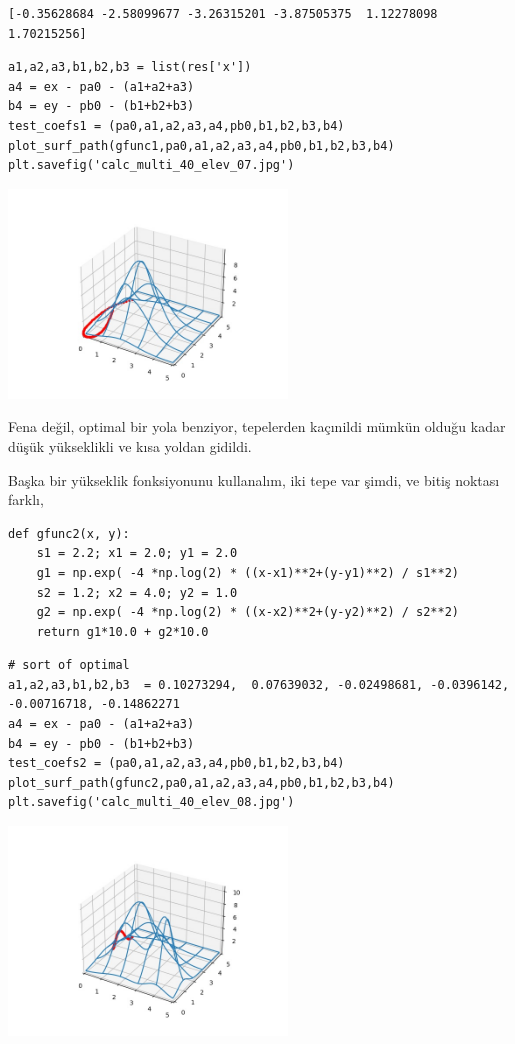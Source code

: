 \documentclass[12pt,fleqn]{article}\usepackage{../../common}
\begin{document}
\begin{verbatim}
[-0.35628684 -2.58099677 -3.26315201 -3.87505375  1.12278098  1.70215256]
\end{verbatim}

\begin{verbatim}
a1,a2,a3,b1,b2,b3 = list(res['x'])
a4 = ex - pa0 - (a1+a2+a3)
b4 = ey - pb0 - (b1+b2+b3)
test_coefs1 = (pa0,a1,a2,a3,a4,pb0,b1,b2,b3,b4)
plot_surf_path(gfunc1,pa0,a1,a2,a3,a4,pb0,b1,b2,b3,b4)
plt.savefig('calc_multi_40_elev_07.jpg')
\end{verbatim}

\includegraphics[width=20em]{calc_multi_40_elev_07.jpg}

Fena değil, optimal bir yola benziyor, tepelerden kaçınildi mümkün olduğu kadar
düşük yükseklikli ve kısa yoldan gidildi.

Başka bir yükseklik fonksiyonunu kullanalım, iki tepe var şimdi, ve
bitiş noktası farklı,

\begin{verbatim}
def gfunc2(x, y):
    s1 = 2.2; x1 = 2.0; y1 = 2.0
    g1 = np.exp( -4 *np.log(2) * ((x-x1)**2+(y-y1)**2) / s1**2)
    s2 = 1.2; x2 = 4.0; y2 = 1.0
    g2 = np.exp( -4 *np.log(2) * ((x-x2)**2+(y-y2)**2) / s2**2)
    return g1*10.0 + g2*10.0
\end{verbatim}

\begin{verbatim}
# sort of optimal
a1,a2,a3,b1,b2,b3  = 0.10273294,  0.07639032, -0.02498681, -0.0396142,  -0.00716718, -0.14862271
a4 = ex - pa0 - (a1+a2+a3)
b4 = ey - pb0 - (b1+b2+b3)
test_coefs2 = (pa0,a1,a2,a3,a4,pb0,b1,b2,b3,b4)
plot_surf_path(gfunc2,pa0,a1,a2,a3,a4,pb0,b1,b2,b3,b4)
plt.savefig('calc_multi_40_elev_08.jpg')
\end{verbatim}

\includegraphics[width=20em]{calc_multi_40_elev_08.jpg}
\end{document}
